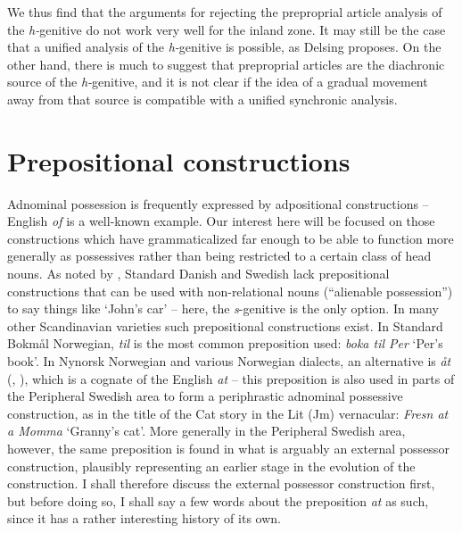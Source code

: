 \begin{styleBodytextC}
We thus find that the arguments for rejecting the preproprial article analysis of the \textit{h-}genitive do not work very well for the inland zone. It may still be the case that a unified analysis of the \textit{h-}genitive is possible, as Delsing proposes. On the other hand, there is much to suggest that preproprial articles are the diachronic source of the \textit{h-}genitive, and it is not clear if the idea of a gradual movement away from that source is compatible with a unified synchronic analysis. 

\end{styleBodytextC}

\section{\rmfamily\bfseries Prepositional constructions}
\label{bkm:Ref136433022}
\begin{styleBodyTextFirst}
Adnominal possession is frequently expressed by adpositional constructions – English \textit{of }is a well-known example. Our interest here will be focused on those constructions which have grammaticalized far enough to be able to function more generally as possessives rather than being restricted to a certain class of head nouns. As noted by \citet[43]{Delsing2003a}, Standard Danish and Swedish lack prepositional constructions that can be used with non-relational nouns (“alienable possession”) to say things like ‘John’s car’ – here, the \textit{s}{}-genitive is the only option. In many other Scandinavian varieties such prepositional constructions exist. In Standard Bokmål Norwegian, \textit{til} is the most common preposition used: \textit{boka til Per} ‘Per’s book’. In Nynorsk Norwegian and various Norwegian dialects, an alternative is \textit{åt }(\citet[263]{FaarlundEtAl1997}, \citet[43]{Delsing2003a}), which is a cognate of the English \textit{at} – this preposition is also used in parts of the Peripheral Swedish area to form a periphrastic adnominal possessive construction, as in the title of the Cat story in the Lit (Jm) vernacular: \textit{Fresn at a Momma }‘Granny’s cat’. More generally in the Peripheral Swedish area, however, the same preposition is found in what is arguably an external possessor construction, plausibly representing an earlier stage in the evolution of the construction. I shall therefore discuss the external possessor construction first, but before doing so, I shall say a few words about the preposition \textit{at }as such, since it has a rather interesting history of its own. 

\end{styleBodyTextFirst}

